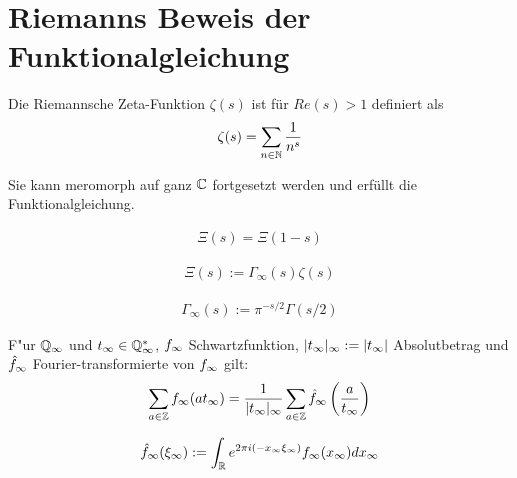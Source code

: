 \section{Riemanns Beweis der Funktionalgleichung}
\label{sec:riemann2}
	\begin{defi}
		\label{def:zeta}
		Die Riemannsche Zeta-Funktion $\zeta(s)$  ist für $Re(s)>1$ definiert als
		\begin{align}
			\zeta (s) = \sum_{n\in \mathbb{N}} \frac{1}{n^s}
		\end{align}
	\end{defi}
	Sie kann meromorph auf ganz $\mathbb{C}$ fortgesetzt werden und erfüllt die Funktionalgleichung.
	\begin{satz}
		\label{eq:funktionalgleichung}
		\begin{align}
			 \Xi(s) = \Xi(1-s)
		\end{align}
	\end{satz}


	\begin{defi}
		\label{def:xi}
		\begin{align}
			\Xi(s) := \Gamma_\infty(s) \zeta(s)
		\end{align}
	\end{defi}



	\begin{defi}
		\label{def:gamma_infty}
		\begin{align}
			\Gamma_\infty(s) := \pi^{-s/2} \Gamma(s/2)
		\end{align}
	\end{defi}

	\begin{satz}
		\label{satz:poisson}
		F"ur $\mathbb{Q}_\infty$ und $t_\infty \in \mathbb{Q}_\infty^*$, $f_\infty$ Schwartzfunktion, $|t_\infty|_\infty := |t_\infty|$ Absolutbetrag und $\hat{f}_\infty$ Fourier-transformierte von $f_\infty$ gilt:
		\begin{align}
			\sum_{a \in \mathbb{Z}} f_\infty (a t_\infty) = \frac{1}{|t_\infty|_\infty} \sum_{a \in \mathbb{Z}} \hat{f}_\infty \left( \frac{a} {t_\infty} \right)
		\end{align}
	\end{satz}

	\begin{defi}[Fouriertransformation]
		\label{def:fourier}
		\begin{align}
			\hat{f}_\infty(\xi_\infty) := \int_{\mathbb{R}}{e^{ 2\pi i (-x_\infty\xi_\infty) }f_\infty(x_\infty)dx_\infty}
		\end{align}
	\end{defi}

